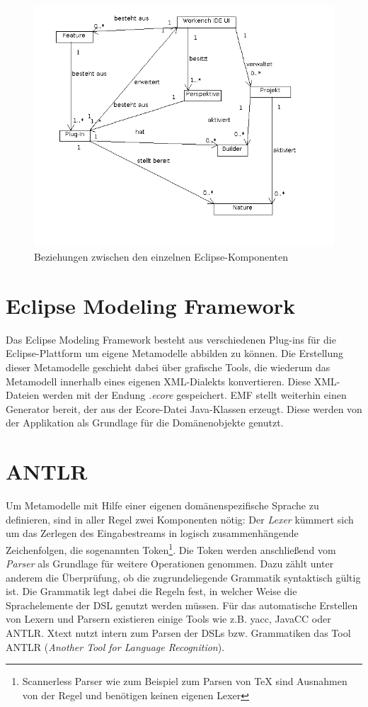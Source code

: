 \documentclass[a4paper,12pt]{scrreprt}
\begin{document}
\begin{figure}[h]
	\centering
		\includegraphics[width=500px]{diagramme/eclipse-beziehung.png}
		\caption{Beziehungen zwischen den einzelnen Eclipse-Komponenten}
		\label{fig:eclipse-beziehungen}
\end{figure}

\section{Eclipse Modeling Framework}
Das Eclipse Modeling Framework besteht aus verschiedenen Plug-ins für die Eclipse-Plattform um eigene  Metamodelle abbilden zu können. Die Erstellung dieser  Metamodelle geschieht dabei über grafische Tools, die wiederum das  Metamodell innerhalb eines eigenen XML-Dialekts konvertieren. Diese XML-Dateien werden mit der Endung \textit{.ecore} gespeichert.
EMF stellt weiterhin einen Generator bereit, der aus der Ecore-Datei Java-Klassen erzeugt. Diese werden von der Applikation als Grundlage für die Domänenobjekte genutzt. 
\section{ANTLR}
Um  Metamodelle mit Hilfe einer eigenen domänenspezifische Sprache zu definieren, sind in aller Regel zwei Komponenten nötig: Der \textit{Lexer} kümmert sich um das Zerlegen des Eingabestreams in logisch zusammenhängende Zeichenfolgen, die sogenannten Token\footnote{Scannerless Parser wie zum Beispiel zum Parsen von TeX sind Ausnahmen von der Regel und benötigen keinen eigenen Lexer}. Die Token werden anschließend vom \textit{Parser} als Grundlage für weitere Operationen genommen. Dazu zählt unter anderem die Überprüfung, ob die zugrundeliegende Grammatik syntaktisch gültig ist. Die Grammatik legt dabei die Regeln fest, in welcher Weise die Sprachelemente der DSL genutzt werden müssen.
Für das automatische Erstellen von Lexern und Parsern existieren einige Tools wie z.B. yacc, JavaCC oder ANTLR. Xtext nutzt intern zum Parsen der DSLs bzw. Grammatiken das Tool ANTLR (\textit{Another Tool for Language Recognition}).
\end{document}
